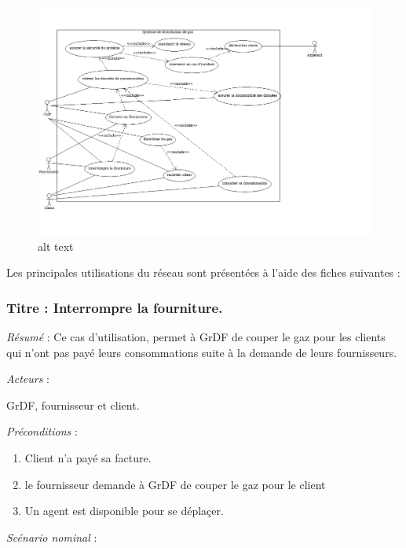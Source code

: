 \documentclass[
12pt,
french,                           %
a4paper,
]{article}
\begin{document}
\begin{figure}[htbp]
\centering
\includegraphics{Diagrammedecasdutilisation.png}
\caption{alt text}
\end{figure}

Les principales utilisations du réseau sont présentées à l'aide des
fiches suivantes :

\subsubsection{Titre : Interrompre la fourniture.}

\emph{Résumé} : Ce cas d'utilisation, permet à GrDF de couper le gaz
pour les clients qui n'ont pas payé leurs consommations suite à la
demande de leurs fournisseurs.

\emph{Acteurs} :

GrDF, fournisseur et client.

\emph{Préconditions} :

\begin{enumerate}[1.]
\item
  Client n'a payé sa facture.
\item
  le fournisseur demande à GrDF de couper le gaz pour le client
\item
  Un agent est disponible pour se déplaçer.
\end{enumerate}

\emph{Scénario nominal} :
\end{document}
